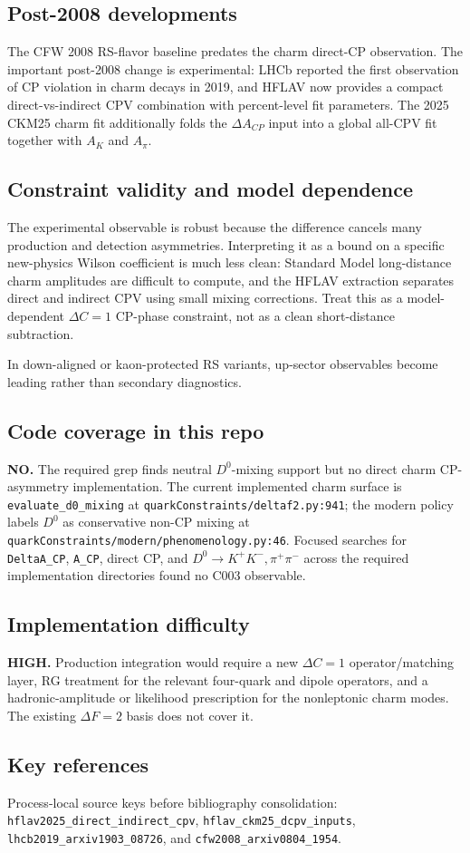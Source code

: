 \subsection*{Post-2008 developments}
The CFW 2008 RS-flavor baseline predates the charm direct-CP observation.
The important post-2008 change is experimental: LHCb reported the first
observation of CP violation in charm decays in 2019, and HFLAV now provides a
compact direct-vs-indirect CPV combination with percent-level fit parameters.
The 2025 CKM25 charm fit additionally folds the \(\Delta A_{CP}\) input into a
global all-CPV fit together with \(A_K\) and \(A_{\pi}\).

\subsection*{Constraint validity and model dependence}
The experimental observable is robust because the difference cancels many
production and detection asymmetries.  Interpreting it as a bound on a specific
new-physics Wilson coefficient is much less clean: Standard Model long-distance
charm amplitudes are difficult to compute, and the HFLAV extraction separates
direct and indirect CPV using small mixing corrections.  Treat this as a
model-dependent \(\Delta C=1\) CP-phase constraint, not as a clean
short-distance subtraction.

In down-aligned or kaon-protected RS variants, up-sector observables become
leading rather than secondary diagnostics.

\subsection*{Code coverage in this repo}
\textbf{NO.}  The required grep finds neutral \(D^0\)-mixing support but no
direct charm CP-asymmetry implementation.  The current implemented charm
surface is \texttt{evaluate\_d0\_mixing} at
\texttt{quarkConstraints/deltaf2.py:941}; the modern policy labels \(D^0\) as
conservative non-CP mixing at \texttt{quarkConstraints/modern/phenomenology.py:46}.
Focused searches for \texttt{DeltaA\_CP}, \texttt{A\_CP}, direct CP, and
\(D^0\to K^+K^-,\pi^+\pi^-\) across the required implementation directories
found no C003 observable.

\subsection*{Implementation difficulty}
\textbf{HIGH.}  Production integration would require a new \(\Delta C=1\)
operator/matching layer, RG treatment for the relevant four-quark and dipole
operators, and a hadronic-amplitude or likelihood prescription for the
nonleptonic charm modes.  The existing \(\Delta F=2\) basis does not cover it.

\subsection*{Key references}
Process-local source keys before bibliography consolidation:
\texttt{hflav2025\_direct\_indirect\_cpv},
\texttt{hflav\_ckm25\_dcpv\_inputs},
\texttt{lhcb2019\_arxiv1903\_08726}, and
\texttt{cfw2008\_arxiv0804\_1954}.
